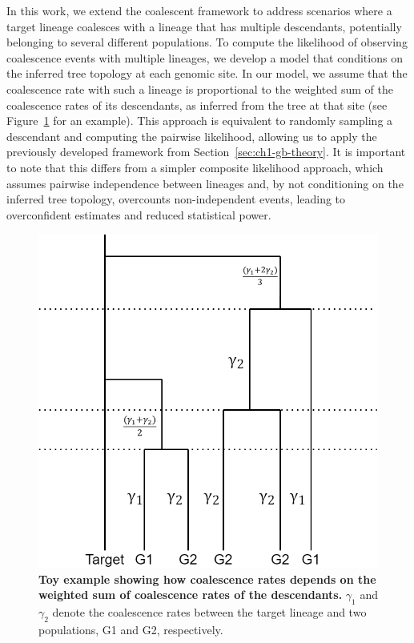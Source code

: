 In this work, we extend the coalescent framework to address scenarios where a target lineage coalesces with a lineage that has multiple descendants, potentially belonging to several different populations. To compute the likelihood of observing coalescence events with multiple lineages, we develop a model that conditions on the inferred tree topology at each genomic site. In our model, we assume that the coalescence rate with such a lineage is proportional to the weighted sum of the coalescence rates of its descendants, as inferred from the tree at that site (see Figure~\ref{fig1} for an example). This approach is equivalent to randomly sampling a descendant and computing the pairwise likelihood, allowing us to apply the previously developed framework from Section~\ref{sec:ch1-gb-theory}. It is important to note that this differs from a simpler composite likelihood approach, which assumes pairwise independence between lineages and, by not conditioning on the inferred tree topology, overcounts non-independent events, leading to overconfident estimates and reduced statistical power.

\begin{figure}[h!]
    \centering
    \includegraphics[scale=0.275]{figures/ghost buster simon myers-Page-1.png}
    \caption{\textbf{Toy example showing how coalescence rates depends on the weighted sum of coalescence rates of the descendants.} $\gamma_1$ and $\gamma_2$ denote the coalescence rates between the target lineage and two populations, G1 and G2, respectively.}
    \label{fig1}
\end{figure}

